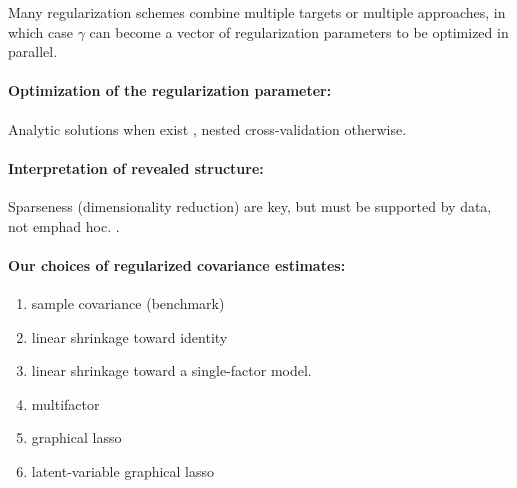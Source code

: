 Many regularization schemes combine multiple targets or multiple approaches, in which case $\gamma$ can become a vector of regularization parameters \citep{Schafer:2005,Fan:2011,Ma:2013} to be optimized in parallel.

\paragraph{Optimization of the regularization parameter:}
Analytic solutions when exist \citep{Ledoit:2004,Schafer:2005}, nested cross-validation otherwise.

\paragraph{Interpretation of revealed structure:}
Sparseness (dimensionality reduction) are key, but must be supported by data, not emph{ad hoc}. \citep{Fan:2006,Malmersjo:2013}.

\paragraph{Our choices of regularized covariance estimates:}
\begin{enumerate}[\qquad 1.\;\;]
\item sample covariance (benchmark)
\item linear shrinkage toward identity 
\item linear shrinkage toward a single-factor model.
\item multifactor
\item graphical lasso
\item latent-variable graphical lasso
\end{enumerate}

